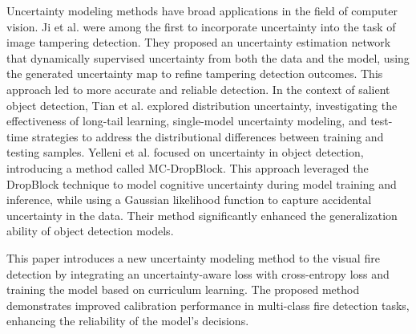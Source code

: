 Uncertainty modeling methods have broad applications in the field of computer vision. Ji et al. \cite{18ji2023} were among the first to incorporate uncertainty into the task of image tampering detection. They proposed an uncertainty estimation network that dynamically supervised uncertainty from both the data and the model, using the generated uncertainty map to refine tampering detection outcomes. This approach led to more accurate and reliable detection. In the context of salient object detection, Tian et al. \cite{19tian2023} explored distribution uncertainty, investigating the effectiveness of long-tail learning, single-model uncertainty modeling, and test-time strategies to address the distributional differences between training and testing samples. Yelleni et al. \cite{7yelleni2024} focused on uncertainty in object detection, introducing a method called MC-DropBlock. This approach leveraged the DropBlock technique to model cognitive uncertainty during model training and inference, while using a Gaussian likelihood function to capture accidental uncertainty in the data. Their method significantly enhanced the generalization ability of object detection models.

This paper introduces a new uncertainty modeling method to the visual fire detection by integrating an uncertainty-aware loss with cross-entropy loss and training the model based on curriculum learning. The proposed method demonstrates improved calibration performance in multi-class fire detection tasks, enhancing the reliability of the model's decisions.
